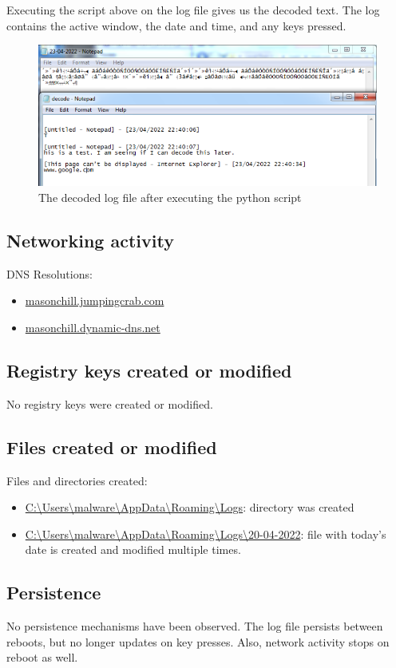 \documentclass{article}
\begin{document}
    Executing the script above on the log file gives us the decoded text.     The log contains the active window, the date and time, and any keys pressed.
    \begin{figure}[H]
        \includegraphics[width=\textwidth]{decoded-logs2.png}
        \caption{The decoded log file after executing the python script}
    \end{figure}
    \subsection{Networking activity}
    DNS Resolutions:
    \begin{itemize}
        \item \url{masonchill.jumpingcrab.com}
        \item \url{masonchill.dynamic-dns.net}
    \end{itemize}
    \subsection{Registry keys created or modified}
    No registry keys were created or modified.
    \subsection{Files created or modified}
    Files and directories created:
    \begin{itemize}
        \item \url{C:\Users\malware\AppData\Roaming\Logs}: directory was created
        \item \url{C:\Users\malware\AppData\Roaming\Logs\20-04-2022}: file with today's date is created and modified multiple times.
    \end{itemize}
    \subsection{Persistence}
    No persistence mechanisms have been observed. The log file persists between reboots, but no longer updates on key presses. Also, network activity stops on reboot as well.
    \pagebreak
\end{document}
